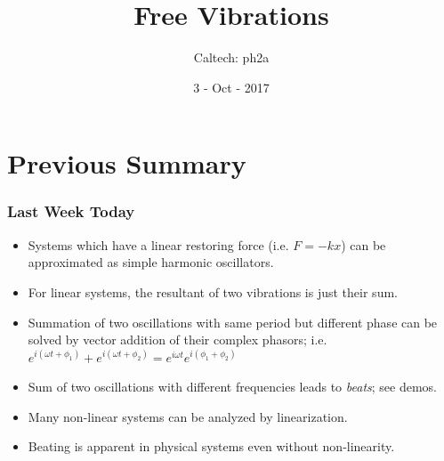 \documentclass[pdf,hideothersubsections]{beamer}
\begin{document}
\title{Free Vibrations}  
\author{Caltech: ph2a}
\date{3 - Oct - 2017}

\frame{\titlepage} 



\section{Previous Summary}
\begin{frame}
\frametitle{Last Week Today}
\begin{itemize}
\item Systems which have a linear restoring force (i.e. $F = -k x$) can be approximated
  as simple harmonic oscillators.
\pause
\item For linear systems, the resultant of two vibrations is just their sum.
\pause
\item Summation of two oscillations with same period but different
  phase can be solved by vector addition of their complex phasors;
  i.e. $e^{i (\omega t + \phi_1)} + e^{i (\omega t + \phi_2)} = e^{i \omega t} e^{i (\phi_1 + \phi_2)}$
\pause
\item Sum of two oscillations with different frequencies leads to
  \emph{beats}; see demos.
\pause
\item Many non-linear systems can be analyzed by linearization.
\pause
\item Beating is apparent in physical systems even without non-linearity.
\end{itemize}
\end{frame}
\end{document}

